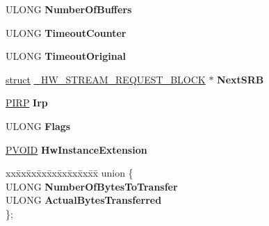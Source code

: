 \begin{DoxyCompactItemize}
\item 
\mbox{\label{struct___h_w___s_t_r_e_a_m___r_e_q_u_e_s_t___b_l_o_c_k_ae4d0ba1e55056bc3075959d6cb25edb5}} 
U\+L\+O\+NG {\bfseries Number\+Of\+Buffers}
\item 
\mbox{\label{struct___h_w___s_t_r_e_a_m___r_e_q_u_e_s_t___b_l_o_c_k_a1989ff2334bffd374e311200f15c681a}} 
U\+L\+O\+NG {\bfseries Timeout\+Counter}
\item 
\mbox{\label{struct___h_w___s_t_r_e_a_m___r_e_q_u_e_s_t___b_l_o_c_k_a4f78811672abd0372c60ee8936de0f78}} 
U\+L\+O\+NG {\bfseries Timeout\+Original}
\item 
\mbox{\label{struct___h_w___s_t_r_e_a_m___r_e_q_u_e_s_t___b_l_o_c_k_ac7c00b7ca1a1d81c4f79a2fc6804111c}} 
\hyperlink{interfacestruct}{struct} \hyperlink{struct___h_w___s_t_r_e_a_m___r_e_q_u_e_s_t___b_l_o_c_k}{\+\_\+\+H\+W\+\_\+\+S\+T\+R\+E\+A\+M\+\_\+\+R\+E\+Q\+U\+E\+S\+T\+\_\+\+B\+L\+O\+CK} $\ast$ {\bfseries Next\+S\+RB}
\item 
\mbox{\label{struct___h_w___s_t_r_e_a_m___r_e_q_u_e_s_t___b_l_o_c_k_a9971a88214e0cc23eb8b4f912a727d78}} 
\hyperlink{interfacevoid}{P\+I\+RP} {\bfseries Irp}
\item 
\mbox{\label{struct___h_w___s_t_r_e_a_m___r_e_q_u_e_s_t___b_l_o_c_k_a785c47a656dc6f797ef9351a1330de33}} 
U\+L\+O\+NG {\bfseries Flags}
\item 
\mbox{\label{struct___h_w___s_t_r_e_a_m___r_e_q_u_e_s_t___b_l_o_c_k_aa361e854a24e1c1d118fc8069c62bab4}} 
\hyperlink{interfacevoid}{P\+V\+O\+ID} {\bfseries Hw\+Instance\+Extension}
\item 
\mbox{\label{struct___h_w___s_t_r_e_a_m___r_e_q_u_e_s_t___b_l_o_c_k_ae833dcc5776dcaabef0e084bca1986a9}} 
\begin{tabbing}
xx\=xx\=xx\=xx\=xx\=xx\=xx\=xx\=xx\=\kill
union \{\\
\>ULONG {\bfseries NumberOfBytesToTransfer}\\
\>ULONG {\bfseries ActualBytesTransferred}\\
\}; \\


\end{tabbing}
\end{DoxyCompactItemize}
